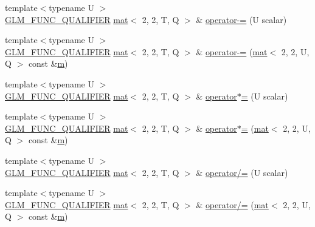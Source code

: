 \begin{DoxyCompactItemize}
\item 
{\footnotesize template$<$typename U $>$ }\\\mbox{\hyperlink{setup_8hpp_a33fdea6f91c5f834105f7415e2a64407}{G\+L\+M\+\_\+\+F\+U\+N\+C\+\_\+\+Q\+U\+A\+L\+I\+F\+I\+ER}} \mbox{\hyperlink{structglm_1_1mat}{mat}}$<$ 2, 2, T, Q $>$ \& \mbox{\hyperlink{structglm_1_1mat_3_012_00_012_00_01_t_00_01_q_01_4_ad8f70b802e239d71a22c436849401a66}{operator-\/=}} (U scalar)
\item 
{\footnotesize template$<$typename U $>$ }\\\mbox{\hyperlink{setup_8hpp_a33fdea6f91c5f834105f7415e2a64407}{G\+L\+M\+\_\+\+F\+U\+N\+C\+\_\+\+Q\+U\+A\+L\+I\+F\+I\+ER}} \mbox{\hyperlink{structglm_1_1mat}{mat}}$<$ 2, 2, T, Q $>$ \& \mbox{\hyperlink{structglm_1_1mat_3_012_00_012_00_01_t_00_01_q_01_4_aeecbe99c8dd463d2a57ddd006608f5d0}{operator-\/=}} (\mbox{\hyperlink{structglm_1_1mat}{mat}}$<$ 2, 2, U, Q $>$ const \&\mbox{\hyperlink{_s_d_l__opengl__glext_8h_af593500c283bf1a787a6f947f503a5c2}{m}})
\item 
{\footnotesize template$<$typename U $>$ }\\\mbox{\hyperlink{setup_8hpp_a33fdea6f91c5f834105f7415e2a64407}{G\+L\+M\+\_\+\+F\+U\+N\+C\+\_\+\+Q\+U\+A\+L\+I\+F\+I\+ER}} \mbox{\hyperlink{structglm_1_1mat}{mat}}$<$ 2, 2, T, Q $>$ \& \mbox{\hyperlink{structglm_1_1mat_3_012_00_012_00_01_t_00_01_q_01_4_abd40e7f277b38fb6d4bc253c5750ac22}{operator$\ast$=}} (U scalar)
\item 
{\footnotesize template$<$typename U $>$ }\\\mbox{\hyperlink{setup_8hpp_a33fdea6f91c5f834105f7415e2a64407}{G\+L\+M\+\_\+\+F\+U\+N\+C\+\_\+\+Q\+U\+A\+L\+I\+F\+I\+ER}} \mbox{\hyperlink{structglm_1_1mat}{mat}}$<$ 2, 2, T, Q $>$ \& \mbox{\hyperlink{structglm_1_1mat_3_012_00_012_00_01_t_00_01_q_01_4_a1abaf7d5f1778b770aea62171ba17a29}{operator$\ast$=}} (\mbox{\hyperlink{structglm_1_1mat}{mat}}$<$ 2, 2, U, Q $>$ const \&\mbox{\hyperlink{_s_d_l__opengl__glext_8h_af593500c283bf1a787a6f947f503a5c2}{m}})
\item 
{\footnotesize template$<$typename U $>$ }\\\mbox{\hyperlink{setup_8hpp_a33fdea6f91c5f834105f7415e2a64407}{G\+L\+M\+\_\+\+F\+U\+N\+C\+\_\+\+Q\+U\+A\+L\+I\+F\+I\+ER}} \mbox{\hyperlink{structglm_1_1mat}{mat}}$<$ 2, 2, T, Q $>$ \& \mbox{\hyperlink{structglm_1_1mat_3_012_00_012_00_01_t_00_01_q_01_4_a00e71864537d53ed26be1183b6930117}{operator/=}} (U scalar)
\item 
{\footnotesize template$<$typename U $>$ }\\\mbox{\hyperlink{setup_8hpp_a33fdea6f91c5f834105f7415e2a64407}{G\+L\+M\+\_\+\+F\+U\+N\+C\+\_\+\+Q\+U\+A\+L\+I\+F\+I\+ER}} \mbox{\hyperlink{structglm_1_1mat}{mat}}$<$ 2, 2, T, Q $>$ \& \mbox{\hyperlink{structglm_1_1mat_3_012_00_012_00_01_t_00_01_q_01_4_a2ccd7dd34be3dad08262d075de391ed8}{operator/=}} (\mbox{\hyperlink{structglm_1_1mat}{mat}}$<$ 2, 2, U, Q $>$ const \&\mbox{\hyperlink{_s_d_l__opengl__glext_8h_af593500c283bf1a787a6f947f503a5c2}{m}})
\end{DoxyCompactItemize}
